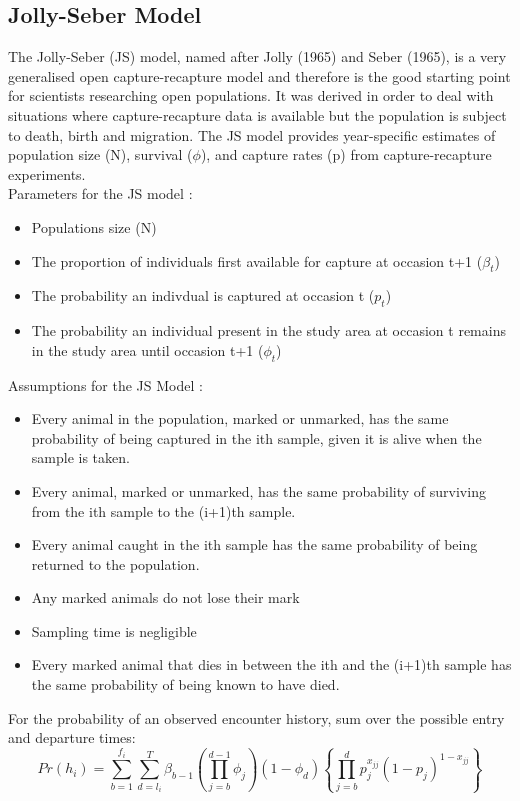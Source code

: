 \documentclass[,oneside]{article}
\numberwithin{equation}{section}
\begin{document}
\subsection{Jolly-Seber Model}
The Jolly-Seber (JS) model, named after Jolly (1965) and Seber (1965), is a very generalised open capture-recapture model and therefore is the good starting point for scientists researching open populations. It was derived in order to deal with situations where capture-recapture data is available but the population is subject to death, birth and migration. \cite{Ap95} The JS model provides year-specific estimates of population size (N), survival ($\phi$), and capture rates (p) from capture-recapture experiments.\\
Parameters for the JS model \cite{Ap92}:
\begin{itemize}
\item Populations size (N)
\item The proportion of individuals first available for capture at occasion t+1 ($\beta_t$)
\item The probability an indivdual is captured at occasion t ($p_t$)
\item The probability an individual present in the study area at occasion t remains in the study area until occasion t+1 ($\phi_t$)
\end{itemize}
Assumptions for the JS Model \cite{Ap95}:
\begin{itemize}
\item Every animal in the population, marked or unmarked, has the same probability of being captured in the ith sample, given it is alive when the sample is taken.
\item Every animal, marked or unmarked, has the same probability of surviving from the ith sample to the (i+1)th sample.
\item Every animal caught in the ith sample has the same probability of being returned to the population.
\item Any marked animals do not lose their mark
\item Sampling time is negligible
\item Every marked animal that dies in between the ith and the (i+1)th sample has the same probability of being known to have died.
\end{itemize}
For the probability of an observed encounter history, sum over the possible entry and departure times:\\
\begin{equation}
Pr(h_i)=\sum_{b=1}^{f_i}\sum_{d=l_i}^{T}\beta_{b-1}\left(\prod_{j=b}^{d-1}\phi_j\right)(1-\phi_d)\left\{\prod_{j=b}^{d}p_{j}^{x_{jj}}(1-p_j)^{1-x_{jj}}\right\}
\end{equation}
\end{document}
